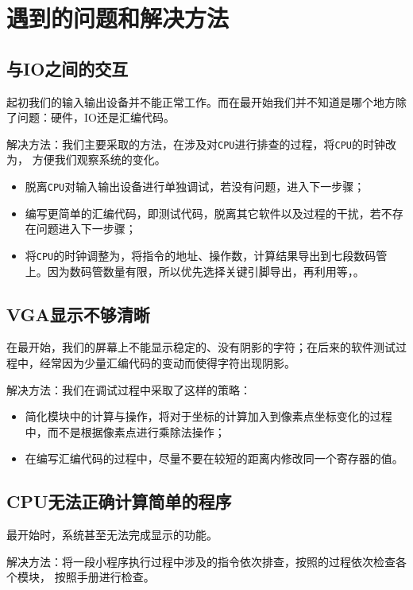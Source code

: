 \section{遇到的问题和解决方法}
\subsection{与IO之间的交互}

\songti
起初我们的输入输出设备并不能正常工作。而在最开始我们并不知道是哪个地方除了问题：硬件，IO还是汇编代码。

解决方法：\kaishu 我们主要采取的方法，在涉及对\texttt{CPU}进行排查的过程，将\texttt{CPU}的时钟改为，
方便我们观察系统的变化。
\begin{itemize}
	\item 脱离\texttt{CPU}对输入输出设备进行单独调试，若没有问题，进入下一步骤；
	\item 编写更简单的汇编代码，即测试代码，脱离其它软件以及过程的干扰，若不存在问题进入下一步骤；
	\item 将\texttt{CPU}的时钟调整为，将指令的地址、操作数，计算结果导出到七段数码管上。因为数码管数量有限，所以优先选择关键引脚导出，再利用等，。
\end{itemize}
\subsection{VGA显示不够清晰}
\songti
在最开始，我们的屏幕上不能显示稳定的、没有阴影的字符；在后来的软件测试过程中，经常因为少量汇编代码的变动而使得字符出现阴影。

解决方法：\kaishu 我们在调试过程中采取了这样的策略：
\begin{itemize}
	\item 简化模块中的计算与操作，将对于坐标的计算加入到像素点坐标变化的过程中，而不是根据像素点进行乘除法操作；
	\item 在编写汇编代码的过程中，尽量不要在较短的距离内修改同一个寄存器的值。
\end{itemize}
\subsection{CPU无法正确计算简单的程序}
\songti
最开始时，系统甚至无法完成显示的功能。

解决方法：\kaishu 将一段小程序执行过程中涉及的指令依次排查，按照的过程依次检查各个模块，
按照手册进行检查。

